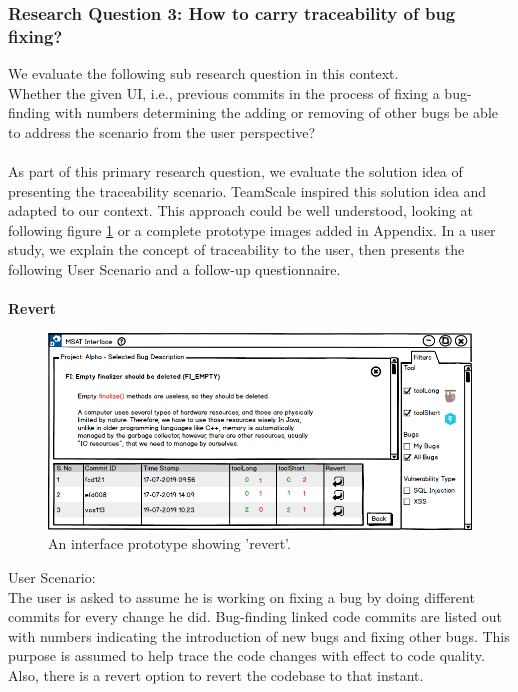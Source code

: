 \subsubsection{Research Question 3: How to carry traceability of bug fixing?}

We evaluate the following sub research question in this context. \\

Whether the given UI, i.e., previous commits in the process of fixing a bug-finding with numbers determining the adding or removing of other bugs be able to address the scenario from the user perspective? \\ \\

As part of this primary research question, we evaluate the solution idea of presenting the traceability scenario. TeamScale inspired this solution idea and adapted to our context. This approach could be well understood, looking at following figure \ref{fig:S13_revert} or a complete prototype images added in Appendix. In a user study, we explain the concept of traceability to the user, then presents the following User Scenario and a follow-up questionnaire. \\ \\


\textbf{Revert}
\begin{figure}[hbt!]
	\centering
	\includegraphics[width=\linewidth]{figures/solution_ideas_snaps/S13_revert}
	\caption{An interface prototype showing 'revert'.}
	\label{fig:S13_revert}
\end{figure}


User Scenario: \\

The user is asked to assume he is working on fixing a bug by doing different commits for every change he did. Bug-finding linked code commits are listed out with numbers indicating the introduction of new bugs and fixing other bugs. This purpose is assumed to help trace the code changes with effect to code quality. Also, there is a revert option to revert the codebase to that instant. \\ \\

